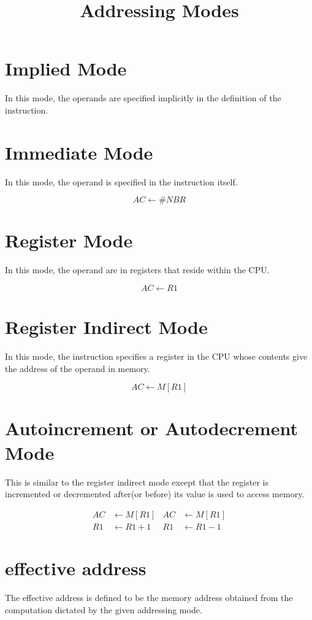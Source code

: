 \documentclass[12pt]{article}
\begin{document}
\title{Addressing Modes}
\maketitle

\section{Implied Mode}
In this mode, the operands are specified implicitly in the definition of the instruction.

\section{Immediate Mode}
In this mode, the operand is specified in the instruction itself.

$$
AC \leftarrow \#NBR
$$

\section{Register Mode}
In this mode, the operand are in registers that reside within the CPU.

$$
AC \leftarrow R1
$$

\section{Register Indirect Mode}
In this mode, the instruction specifies a register in the CPU whose contents give the address of the operand in memory.

$$
AC \leftarrow M[R1]
$$


\section{Autoincrement or Autodecrement Mode}
This is similar to the register indirect mode except that the register is incremented or decremented after(or before) its value is used to access memory.

\begin{align*}
AC &\leftarrow M[R1]  &  AC &\leftarrow M[R1] \\ 
R1 &\leftarrow R1 + 1 &  R1 &\leftarrow R1 - 1
\end{align*}


\section{effective address}
The effective address is defined to be the memory address obtained from the computation dictated by the given addressing mode.
\end{document}
